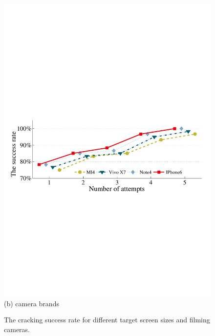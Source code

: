 \begin{figure}[!t]
{\begin{minipage}[t]{0.5\textwidth}
                \includegraphics[width=\textwidth]{fig/camera_brands.pdf}\\
                \centering \footnotesize (b) camera brands
             \end{minipage}
        }
        \caption{The cracking success rate for different target screen sizes and filming cameras. }
        \label{fig:screen_size}
    \end{figure}
    
